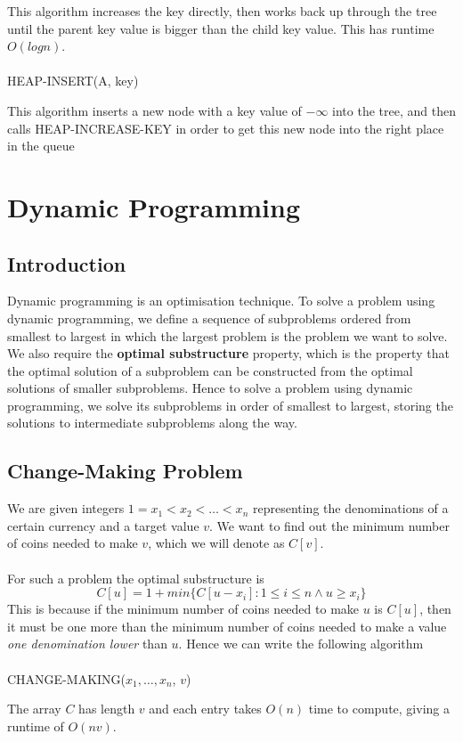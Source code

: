 \documentclass{article}
\begin{document}
        This algorithm increases the key directly, then works back up through the tree until the parent key value is bigger than the child key value. This has runtime $O(log n)$. \\ \\
        HEAP-INSERT(A, key)
        \begin{algorithmic}[1]
        \end{algorithmic}
        This algorithm inserts a new node with a key value of $-\infty$ into the tree, and then calls HEAP-INCREASE-KEY in order to get this new node into the  right place in the queue
\section{Dynamic Programming}
    \subsection{Introduction}
        Dynamic programming is an optimisation technique. To solve a problem using dynamic programming, we define a sequence of subproblems ordered from smallest to largest in which the largest problem is the problem we want to solve. We also require the \textbf{optimal substructure} property, which is the property that the optimal solution of a subproblem can be constructed from the optimal solutions of smaller subproblems. Hence to solve a problem using dynamic programming, we solve its subproblems in order of smallest to largest, storing the solutions to intermediate subproblems along the way.
    \subsection{Change-Making Problem}
        We are given integers $1 = x_1 < x_2 < \dots < x_n$ representing the denominations of a certain currency and a target value $v$. We want to find out the minimum number of coins needed to make $v$, which we will denote as $C[v]$. \\ \\ For such a problem the optimal substructure is \[ C[u] = 1 + min \{ C[u - x_i] : 1 \leq i \leq n \land u \geq x_i \} \]
        This is because if the minimum number of coins needed to make $u$ is $C[u]$, then it must be one more than the minimum number of coins needed to make a value \textit{one denomination lower} than $u$. Hence we can write the following algorithm \\ \\
        CHANGE-MAKING($x_1, \dots, x_n$, $v$)
        \begin{algorithmic}[1]
            \EndFor
        \end{algorithmic}
        The array $C$ has length $v$ and each entry takes $O(n)$ time to compute, giving a runtime of $O(nv)$.
\end{document}
